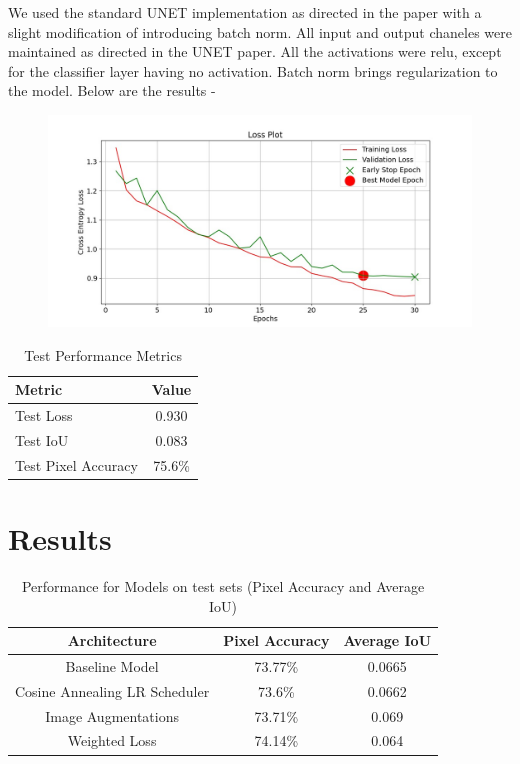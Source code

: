 \documentclass{article}
\begin{document}
We used the standard UNET implementation as directed in the paper with a slight modification of introducing batch norm. All input and output chaneles were maintained as directed in the UNET paper. All the activations were relu, except for the classifier layer having no activation. Batch norm brings regularization to the model. Below are the results - 

\begin{figure}[H]
    \centering
    \includegraphics[width=0.8\linewidth]{unet.jpeg}
\end{figure}


\begin{table}[H]
    \centering
    \begin{tabular}{l c}
        \toprule
        \textbf{Metric} & \textbf{Value} \\
        \midrule
        Test Loss & 0.930 \\
        Test IoU & 0.083 \\
        Test Pixel Accuracy & 75.6\% \\
        \bottomrule
    \end{tabular}
    \caption{Test Performance Metrics}
    \label{tab:test_metrics}
\end{table}

\section{Results}

\begin{table}[H]
\centering
\begin{tabular}{|c|c|c|}
\hline
\textbf{Architecture} & \textbf{Pixel Accuracy} & \textbf{Average IoU} \\
\hline
Baseline Model & 73.77\% & 0.0665 \\
\hline
Cosine Annealing LR Scheduler & 73.6\% & 0.0662 \\
\hline
Image Augmentations & 73.71\% & 0.069 \\
\hline
Weighted Loss  & 74.14\% & 0.064 \\
\hline
\end{tabular}
\caption{Performance for Models on test sets (Pixel Accuracy and Average IoU)}
\label{tab:performance_metrics}
\end{table}
\end{document}
